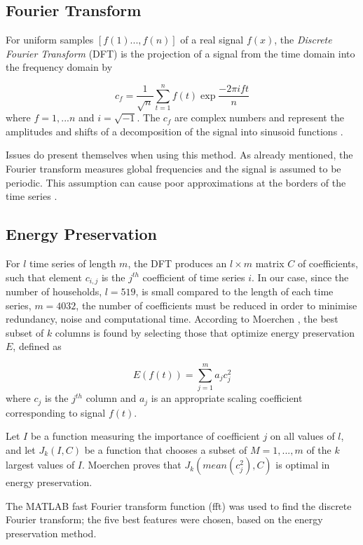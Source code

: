 \householdConv %



\subsection*{Fourier Transform}

For uniform samples $[f(1)...,f(n)]$ of a real signal $f(x)$, the \textit{Discrete Fourier Transform} (DFT) is the projection of a signal from the time domain into the frequency domain by

\[c_f=\frac{1}{\sqrt{n}}\sum_{t=1}^nf(t)\exp{\frac{-2\pi ift}{n}}\]
where $f=1,...n$ and $i=\sqrt{-1}$. The $c_f$ are complex numbers and represent
the amplitudes and shifts of a decomposition of the signal into sinusoid functions \cite{Moerchen}.


Issues do present themselves when using this method. As already mentioned, the Fourier transform measures global frequencies and the signal is assumed to be periodic. This assumption can cause poor approximations at the borders of the time series \cite{Moerchen}.

\subsection*{Energy Preservation}

For $l$ time series of length $m$, the DFT produces an $l \times m$ matrix $C $ of coefficients, such that element $c_{i,j}$ is the $j^{th}$ coefficient of time series $i$. In our case, since the number of households, $l=519$, is small compared to the length of each time series, $m=4032$, the number of coefficients must be reduced in order to minimise redundancy, noise and computational time. According to Moerchen \cite{Moerchen}, the best subset of $k$ columns is found by selecting those that optimize energy preservation $E$, defined as

\[E(f(t))=\sum_{j=1}^ma_jc^2_j\] 
where $c_j$ is the $j^{th}$ column and $a_j$ is an appropriate scaling coefficient corresponding to signal $f(t)$. 

Let $I$ be a function measuring the importance of coefficient $j$ on all values of $l$, and let $J_k(I,C)$ be a function that chooses a subset of $M = {1, ..., m}$ of the $k$ largest values of $I$. Moerchen \cite{Moerchen} proves that $J_k(mean(c_j^2),C)$ is optimal in energy preservation.

The MATLAB fast Fourier transform function (fft) was used to find the discrete Fourier transform; the five best features were chosen, based on the energy preservation method.


